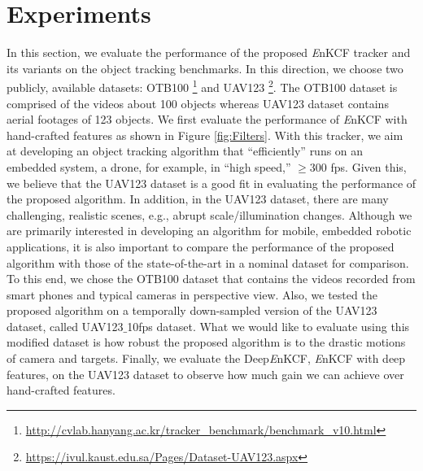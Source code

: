 \documentclass[10pt,twocolumn,letterpaper]{article}
\begin{document}
\section{Experiments} \label{sc:Experiments}
In this section, we evaluate the performance of the proposed {\it E}nKCF
tracker and its variants on the object tracking benchmarks. 
In this direction, we choose two publicly, available datasets:
OTB100 \footnote{\url{http://cvlab.hanyang.ac.kr/tracker_benchmark/benchmark_v10.html}}
and UAV123 \footnote{\url{https://ivul.kaust.edu.sa/Pages/Dataset-UAV123.aspx}}\cite{mueller2016uav123}.
The OTB100 dataset is comprised of the videos about 100 objects
whereas UAV123 dataset contains aerial footages of 123 objects.
We first evaluate the performance of {\it E}nKCF 
with hand-crafted features as shown in Figure \ref{fig:Filters}.  
With this tracker, we aim at developing an object tracking algorithm that ``efficiently'' runs
on an embedded system, a drone, for example, in ``high speed,'' $\ge
300$ fps. Given this, we believe that the UAV123 dataset is a good fit in
evaluating the performance of the proposed algorithm. In addition, in
the UAV123 dataset, there are many challenging, realistic scenes, e.g.,
abrupt scale/illumination changes. Although we are primarily
interested in developing an algorithm for mobile, embedded robotic
applications, it is also important to compare the performance of the
proposed algorithm with those of the state-of-the-art in a nominal
dataset for comparison. To this end, we chose the OTB100 dataset that
contains the videos recorded from smart phones and typical cameras in
perspective view. Also, we tested the proposed algorithm on a
temporally down-sampled version of the UAV123 dataset, called
UAV123$\_$10fps dataset. What we would like to evaluate using this
modified dataset is how robust the proposed algorithm is to the
drastic motions of camera and targets. Finally, we evaluate the Deep{\it E}nKCF, 
{\it E}nKCF with deep features, on the UAV123 dataset to observe how much gain
we can achieve over hand-crafted features.
\end{document}
